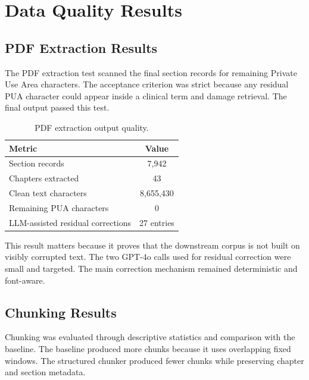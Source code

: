 \section{Data Quality Results}

\subsection{PDF Extraction Results}

The PDF extraction test scanned the final section records for remaining Private Use Area characters. The acceptance criterion was strict because any residual PUA character could appear inside a clinical term and damage retrieval. The final output passed this test.

\begin{table}[htbp]
\centering
\caption{PDF extraction output quality.}
\label{tab:extraction_results}
\begin{tabular}{p{} c}
\toprule
\textbf{Metric} & \textbf{Value}\\
\midrule
Section records & 7,942\\
Chapters extracted & 43\\
Clean text characters & 8,655,430\\
Remaining PUA characters & 0\\
LLM-assisted residual corrections & 27 entries\\
\bottomrule
\end{tabular}
\end{table}

This result matters because it proves that the downstream corpus is not built on visibly corrupted text. The two GPT-4o calls used for residual correction were small and targeted. The main correction mechanism remained deterministic and font-aware.

\subsection{Chunking Results}

Chunking was evaluated through descriptive statistics and comparison with the baseline. The baseline produced more chunks because it uses overlapping fixed windows. The structured chunker produced fewer chunks while preserving chapter and section metadata.

